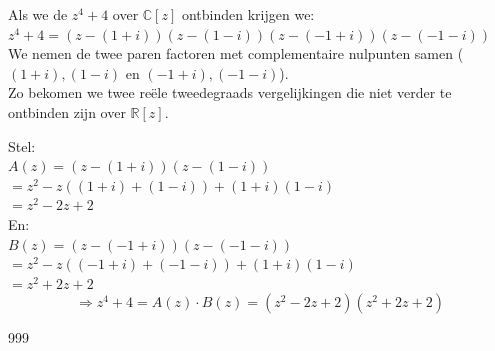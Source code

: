 \documentclass[a4paper]{article}
\begin{document}
Als we de $z^4 + 4$ over $\mathbb{C}[z]$ ontbinden krijgen we:\\

$z^4 + 4 = (z - (1+i))(z - (1-i))(z - (-1+i))(z - (-1-i))$\\

We nemen de twee paren factoren met complementaire nulpunten samen ($(1+i), (1-i)$ en $(-1+i), (-1-i)$).\\

Zo bekomen we twee reële tweedegraads vergelijkingen die niet verder te ontbinden zijn over $\mathbb{R}[z]$.\\

\newpage

Stel:\\

$A(z) = (z - (1+i))(z - (1-i))$ \\

$= z^2 - z((1+i) + (1-i)) + (1+i)(1-i)$ \\

$= z^2 - 2z + 2$\\

En:\\

$B(z) = (z - (-1+i))(z - (-1-i))$ \\

$= z^2 - z((-1+i) + (-1-i)) + (1+i)(1-i)$ \\

$= z^2 + 2z + 2$\\

$$\Rightarrow \boxed{z^4 + 4 = A(z) \cdot B(z) = (z^2 - 2z + 2)(z^2 + 2z + 2)}$$
	


\begin{thebibliography}{999}
\end{thebibliography}
\end{document}

